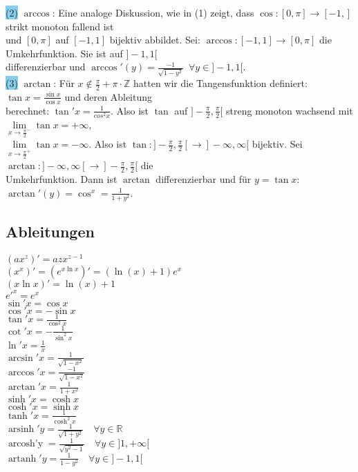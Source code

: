 \documentclass[10pt]{article}
\begin{document}
        \indent \colorbox{SkyBlue}{(2)} $\arccos$:
                Eine analoge Diskussion, wie in (1) zeigt, dass
                $\cos:[0,\pi]\longrightarrow[-1,]$ strikt monoton fallend ist\\
        \indent und $[0,\pi]$ auf $[-1,1]$ bijektiv abbildet. Sei:
                $\arccos:[-1,1]\longrightarrow[0,\pi]$ die 
                Umkehrfunktion. Sie ist auf $]-1,1[$ \\
        \indent differenzierbar und
                $\arccos'(y)=\frac{-1}{\sqrt{1-y^2}}\enspace\forall y\in]-1,1[$.
                \\
        \indent \colorbox{SkyBlue}{(3)} $\arctan$:
                Für $x\notin\frac{\pi}{2}+\pi\cdot\mathbb{Z}$
                hatten wir die Tangensfunktion definiert:
                $\tan x=\frac{\sin x}{\cos x}$ und deren Ableitung \\
        \indent berechnet:
                $\tan'x=\frac{1}{cos^2x}$. Also ist $\tan$ auf
                $]-\frac{\pi}{2},\frac{\pi}{2}[$ streng monoton wachsend mit
                $\lim\limits_{x\to\frac{\pi}{2}^{-}}\tan x=+\infty$,\\
        \indent $\lim\limits_{x\to\frac{\pi}{2}^{+}}\tan x=-\infty$.
                Also ist 
                $\tan:]-\frac{\pi}{2},\frac{\pi}{2}[
                \longrightarrow]-\infty,\infty[$ bijektiv. Sei
                $\arctan:]-\infty,\infty[\longrightarrow
                ]-\frac{\pi}{2},\frac{\pi}{2}[$ die \\
        \indent Umkehrfunktion.
                Dann ist $\arctan$ differenzierbar und für 
                $y=\tan x$: $\arctan'(y)=\cos^x=\frac{1}{1+y^2}$.

\subsection{Ableitungen}
$(ax^z)'=azx^{z-1}$\\
$(x^x)'=(e^{x\ln x})'=(\ln(x)+1)e^x$\\
$(x\ln x)'=\ln(x)+1$\\
$e'^x=e^x$ \\
$\sin'x=\cos x$\\
$\cos'x=-\sin x$\\
$\tan'x=\frac{1}{\cos^2x}$\\
$\cot'x=-\frac{1}{\sin^2x}$\\
$\ln'x=\frac{1}{x}$\\
$\arcsin'x=\frac{1}{\sqrt{1-x^2}}$\\
$\arccos'x=\frac{-1}{\sqrt{1-x^2}}$\\
$\arctan'x=\frac{1}{1+x^2}$\\
$\sinh'x=\cosh x$\\
$\cosh'x=\sinh x$\\
$\tanh'x=\frac{1}{\cosh^2x}$ \\
$\operatorname{arsinh}'y
        =\frac{1}{\sqrt{1+y^2}}\quad\forall y\in\mathbb{R}$\\
$\operatorname{arcosh'y}
        =\frac{1}{\sqrt{y^2-1}}\quad\forall y\in]1,+\infty[$\\
$\operatorname{artanh}'y=\frac{1}{1-y^2}\quad\forall y\in]-1,1[$\\
\end{document}
